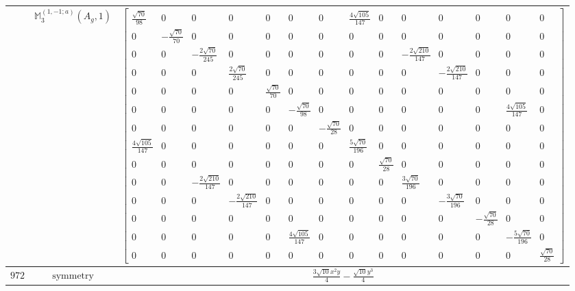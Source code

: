 \documentclass[fleqn,8pt,landscape]{jsarticle}
\begin{document}
\begin{longtable}{ccc}
$  $ & $ \mathbb{M}_{3}^{(1,-1;a)}(A_{g},1) $ & $ \begin{bmatrix} \frac{\sqrt{70}}{98} & 0 & 0 & 0 & 0 & 0 & 0 & \frac{4 \sqrt{105}}{147} & 0 & 0 & 0 & 0 & 0 & 0 \\ 0 & - \frac{\sqrt{70}}{70} & 0 & 0 & 0 & 0 & 0 & 0 & 0 & 0 & 0 & 0 & 0 & 0 \\ 0 & 0 & - \frac{2 \sqrt{70}}{245} & 0 & 0 & 0 & 0 & 0 & 0 & - \frac{2 \sqrt{210}}{147} & 0 & 0 & 0 & 0 \\ 0 & 0 & 0 & \frac{2 \sqrt{70}}{245} & 0 & 0 & 0 & 0 & 0 & 0 & - \frac{2 \sqrt{210}}{147} & 0 & 0 & 0 \\ 0 & 0 & 0 & 0 & \frac{\sqrt{70}}{70} & 0 & 0 & 0 & 0 & 0 & 0 & 0 & 0 & 0 \\ 0 & 0 & 0 & 0 & 0 & - \frac{\sqrt{70}}{98} & 0 & 0 & 0 & 0 & 0 & 0 & \frac{4 \sqrt{105}}{147} & 0 \\ 0 & 0 & 0 & 0 & 0 & 0 & - \frac{\sqrt{70}}{28} & 0 & 0 & 0 & 0 & 0 & 0 & 0 \\ \frac{4 \sqrt{105}}{147} & 0 & 0 & 0 & 0 & 0 & 0 & \frac{5 \sqrt{70}}{196} & 0 & 0 & 0 & 0 & 0 & 0 \\ 0 & 0 & 0 & 0 & 0 & 0 & 0 & 0 & \frac{\sqrt{70}}{28} & 0 & 0 & 0 & 0 & 0 \\ 0 & 0 & - \frac{2 \sqrt{210}}{147} & 0 & 0 & 0 & 0 & 0 & 0 & \frac{3 \sqrt{70}}{196} & 0 & 0 & 0 & 0 \\ 0 & 0 & 0 & - \frac{2 \sqrt{210}}{147} & 0 & 0 & 0 & 0 & 0 & 0 & - \frac{3 \sqrt{70}}{196} & 0 & 0 & 0 \\ 0 & 0 & 0 & 0 & 0 & 0 & 0 & 0 & 0 & 0 & 0 & - \frac{\sqrt{70}}{28} & 0 & 0 \\ 0 & 0 & 0 & 0 & 0 & \frac{4 \sqrt{105}}{147} & 0 & 0 & 0 & 0 & 0 & 0 & - \frac{5 \sqrt{70}}{196} & 0 \\ 0 & 0 & 0 & 0 & 0 & 0 & 0 & 0 & 0 & 0 & 0 & 0 & 0 & \frac{\sqrt{70}}{28} \end{bmatrix} $ \\ \hline
$ 972 $ & $ \text{symmetry} $ & $ \frac{3 \sqrt{10} x^{2} y}{4} - \frac{\sqrt{10} y^{3}}{4} $ \\

\end{longtable}
\end{document}
